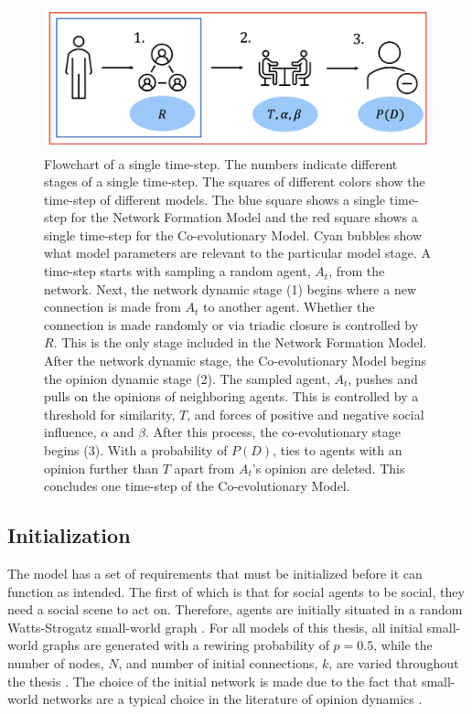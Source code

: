 \documentclass[11pt]{article}
\begin{document}
\begin{figure}[H]
  \centering
  \includegraphics[width=.9\linewidth]{../plots/schematics/model_representation.png}
\caption{Flowchart of a single time-step. The numbers indicate different stages of a single time-step. The squares of different colors show the time-step of different models. The blue square shows a single time-step for the Network Formation Model and the red square shows a single time-step for the Co-evolutionary Model. Cyan bubbles show what model parameters are relevant to the particular model stage. A time-step starts with sampling a random agent, $A_t$, from the network. Next, the network dynamic stage (1) begins where a new connection is made from $A_t$ to another agent. Whether the connection is made randomly or via triadic closure is controlled by $R$. This is the only stage included in the Network Formation Model. After the network dynamic stage, the Co-evolutionary Model begins the opinion dynamic stage (2). The sampled agent, $A_t$, pushes and pulls on the opinions of neighboring agents. This is controlled by a threshold for similarity, $T$, and forces of positive and negative social influence, $\alpha$ and $\beta$. After this process, the co-evolutionary stage begins (3). With a probability of $P(D)$, ties to agents with an opinion further than $T$ apart from $A_t$'s opinion are deleted. This concludes one time-step of the Co-evolutionary Model.}
\label{fig:flowchart}
\end{figure}

\subsection{Initialization}
The model has a set of requirements that must be initialized before it can function as intended. The first of which is that for social agents to be social, they need a social scene to act on. Therefore, agents are initially situated in a random Watts-Strogatz small-world graph \cite{watts_collective_1998}. For all models of this thesis, all initial small-world graphs are generated with a rewiring probability of $p=0.5$, while the number of nodes, $N$, and number of initial connections, $k$, are varied throughout the thesis \cite{watts_collective_1998}. The choice of the initial network is made due to the fact that small-world networks are a typical choice in the literature of opinion dynamics \cite{turner_paths_2018, flache_models_2017}.
\end{document}
